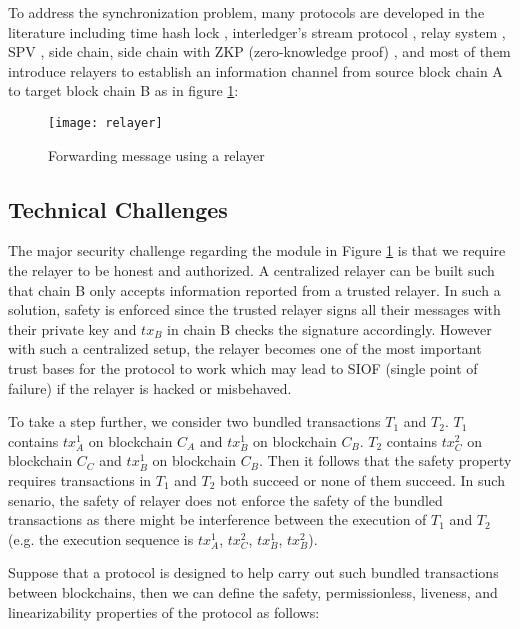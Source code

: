 To address the synchronization problem, many protocols are developed in the literature including time hash lock \cite{poon2016bitcoin}, interledger’s stream protocol \cite{zhang2021enabling}, relay system \cite{lys2021r}, SPV \cite{nakamoto2008bitcoin}, side chain\cite{singh2020sidechain,deng2018sidechain}, side chain with ZKP (zero-knowledge proof) \cite{sidechainzkp}, and most of them introduce relayers \cite{sun2020collaborative-relay, warren20170x-relay} to establish an information channel from source block chain A to target block chain B as in figure \ref{relayer-connection}:
\begin{figure}[!ht]
\texttt{[image: relayer]}
\caption{Forwarding message using a relayer}
\label{relayer-connection}
\end{figure}

\subsection{Technical Challenges}
The major security challenge regarding the module in Figure \ref{relayer-connection} is that we require the relayer to be honest and authorized. A centralized relayer can be built such that chain B only accepts information reported from a trusted relayer. In such a solution, safety is enforced since the trusted relayer signs all their messages with their private key and $tx_B$ in chain B checks the signature accordingly. However with such a centralized setup, the relayer becomes one of the most important trust bases for the protocol to work which may lead to SIOF (single point of failure) if the relayer is hacked or misbehaved.


To take a step further, we consider two bundled transactions $T_1$ and $T_2$. $T_1$ contains $tx_A^1$ on blockchain $C_A$ and $tx_B^1$ on blockchain $C_B$. $T_2$ contains $tx^2_C$ on blockchain $C_C$ and $tx_B^1$ on blockchain $C_B$. Then it follows that the safety property requires transactions in $T_1$ and $T_2$ both succeed or none of them succeed. In such senario, the safety of relayer does not enforce the safety of the bundled transactions as there might be interference between the execution of $T_1$ and $T_2$ (e.g. the execution sequence is $tx_A^1$, $tx_C^2$, $tx_B^1$, $tx_B^2$). 

Suppose that a protocol is designed to help carry out such bundled transactions between blockchains, then we can define the safety, permissionless, liveness, and linearizability properties of the protocol as follows:

